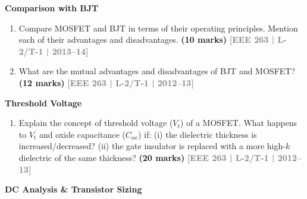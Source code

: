 \documentclass[12pt,a3paper]{article}
\newcommand{\yr}[1]{\hfill\textcolor{gray}{\small\textbf{[#1]}}}
\newcommand{\mk}[1]{\textcolor{orange!70!black}{\small\textbf{(#1 marks)}}}
\newcommand{\subtopic}[2]{%
  \vspace{10pt}
  \noindent\begin{tcolorbox}[colback=#1!8,colframe=#1,boxrule=0.6pt,arc=4pt,
    left=6pt,right=6pt,top=4pt,bottom=4pt]
    \small\bfseries\textcolor{#1}{#2}
  \end{tcolorbox}
  \vspace{2pt}
}
\begin{document}
\subtopic{cA}{Comparison with BJT}
\label{sub:s3-compare}

\begin{enumerate}\item Compare MOSFET and BJT in terms of their operating principles. Mention each of their advantages and disadvantages.
\mk{10} \yr{EEE 263 | L-2/T-1 | 2013--14}

\item What are the mutual advantages and disadvantages of BJT and MOSFET?
\mk{12} \yr{EEE 263 | L-2/T-1 | 2012--13}

\end{enumerate}

\subtopic{cA}{Threshold Voltage}
\label{sub:s3-threshold}

\begin{enumerate}\item Explain the concept of threshold voltage ($V_t$) of a MOSFET. What happens to $V_t$ and oxide capacitance ($C_{ox}$) if: (i) the dielectric thickness is increased/decreased? (ii) the gate insulator is replaced with a more high-$k$ dielectric of the same thickness?
\mk{20} \yr{EEE 263 | L-2/T-1 | 2012--13}

\end{enumerate}

\subtopic{cA}{DC Analysis \& Transistor Sizing}
\label{sub:s3-dc}
\end{document}
